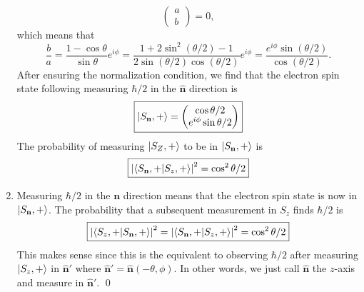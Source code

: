 \documentclass{article}
\theoremstyle{definition}
\newcommand{\f}[2]{\frac{#1}{#2}}
\begin{document}
\begin{enumerate}[label=(\alph*)]
\begin{equation*}
\begin{pmatrix}
	a \\ b
	\end{pmatrix} = 0,
	\end{equation*}
	which means that
	\begin{equation*}
	\f{b}{a} = \f{1-\cos\theta}{\sin\theta} e^{i\phi} = \f{1+2\sin^2(\theta/2)-1}{2\sin(\theta/2)\cos(\theta/2)}e^{i\phi} = \f{e^{i\phi}\sin(\theta/2)}{\cos(\theta/2)}.
	\end{equation*}
	After ensuring the normalization condition, we find that the electron spin state following measuring $\hbar/2$ in the $\widehat{\mathbf{n}}$ direction is 
	\begin{equation*}
	\boxed{\ket{S_\mathbf{n}, +} = \begin{pmatrix}
		\cos\theta/2 \\ e^{i\phi}\sin\theta/2
		\end{pmatrix}}
	\end{equation*}
	The probability of measuring $\ket{S_Z,+}$ to be in $\ket{S_\mathbf{n},+}$ is 
	\begin{equation*}
	\boxed{\abs{\bra{S_\mathbf{n},+}\ket{S_z,+}}^2 = \cos^2\theta/2}
	\end{equation*}
	
	
	
	
	
	
	\item Measuring $\hbar/2$ in the $\mathbf{n}$ direction means that the electron spin state is now in $\ket{S_\mathbf{n},+}$. The probability that a subsequent measurement in $S_z$ finds $\hbar/2$ is 
	\begin{equation*}
	\boxed{\abs{\bra{S_z,+}\ket{S_\mathbf{n},+}}^2= \abs{\bra{S_\mathbf{n},+}\ket{S_z,+}}^2 = \cos^2\theta/2}
	\end{equation*}
	This makes sense since this is the equivalent to observing $\hbar/2$ after measuring $\ket{S_z,+}$ in $\widehat{\mathbf{n}}'$ where $\widehat{\mathbf{n}}' = \widehat{\mathbf{n}}(-\theta,\phi)$. In other words, we just call $\widehat{\mathbf{n}}$ the $z$-axis and measure in $\widehat{\mathbf{n}}'$. \qed
\end{enumerate}



\newpage
\end{document}
